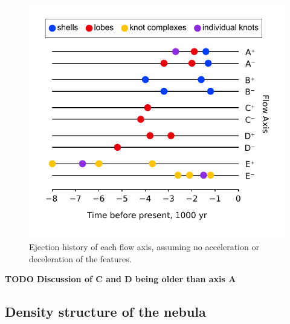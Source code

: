 \documentclass[useAMS, usenatbib]{mnras}
\begin{document}
\begin{figure}
  \includegraphics[width=\linewidth]
  {figs/turtle-flow-axis-history}
  \caption{
    Ejection history of each flow axis, assuming no acceleration or deceleration of the features.
  }
  \label{fig:axis-history}
\end{figure}



\textbf{TODO Discussion of C and D being older than axis A}

\subsection{Density structure of the nebula}
\label{sec:density-structure}
\end{document}
